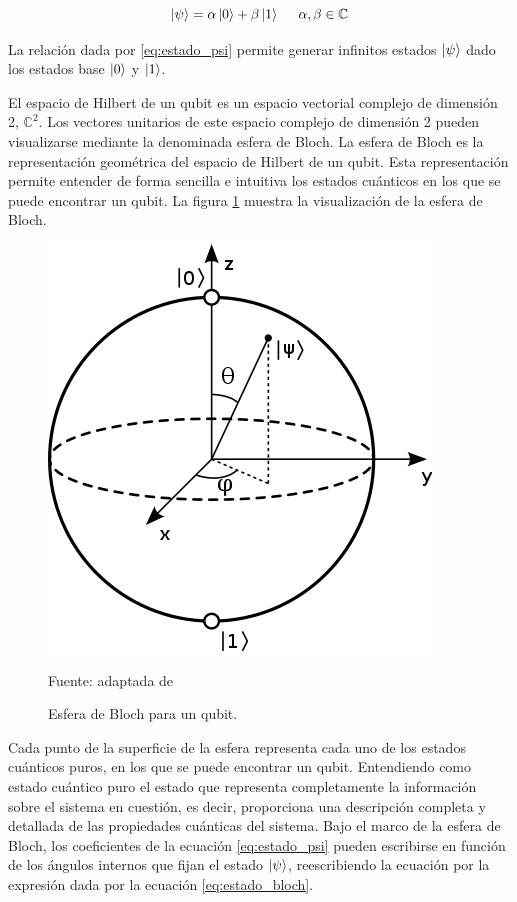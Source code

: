 \begin{equation}
    \ket{\psi} = \alpha\ket{0} + \beta\ket{1} \; \; \; \; \; \alpha, \beta \in \mathbb{C}
    \label{eq:estado_psi}
\end{equation}

La relación dada por \ref{eq:estado_psi} permite generar infinitos estados $\ket{\psi}$ dado los estados base $\ket{0}$ y $\ket{1}$.

\newpage

El espacio de Hilbert de un qubit es un espacio vectorial complejo de dimensión 2, $\mathbb{C}^{2}$. Los vectores unitarios de este espacio complejo de dimensión 2 pueden visualizarse mediante la denominada esfera de Bloch. La esfera de Bloch es la representación geométrica del espacio de Hilbert de un qubit. Esta representación permite entender de forma sencilla e intuitiva los estados cuánticos en los que se puede encontrar un qubit. La figura \ref{fig:bloch_sphere} muestra la visualización de la esfera de Bloch.


\begin{figure}[!ht]
    \centering
    \includegraphics[scale = 0.5]{img/03-esfera_bloch.png}
    \caption{Esfera de Bloch para un qubit.}
    Fuente: adaptada de \cite{bloch}
    \label{fig:bloch_sphere}
\end{figure}

Cada punto de la superficie de la esfera representa cada uno de los estados cuánticos puros, en los que se puede encontrar un qubit. Entendiendo como estado cuántico puro el estado que representa completamente la información sobre el sistema en cuestión, es decir, proporciona una descripción completa y detallada de las propiedades cuánticas del sistema. Bajo el marco de la esfera de Bloch, los coeficientes de la ecuación \ref{eq:estado_psi} pueden escribirse en función de los ángulos internos que fijan el estado $\ket{\psi}$, reescribiendo la ecuación por la expresión dada por la ecuación \ref{eq:estado_bloch}.


